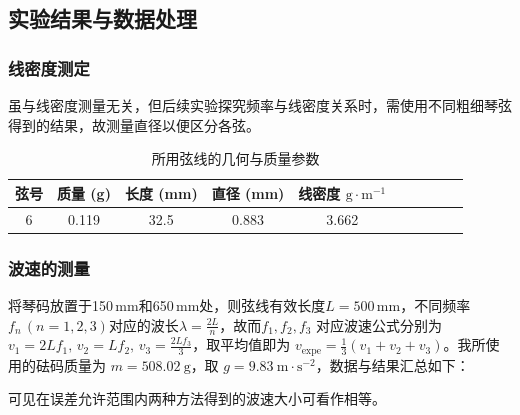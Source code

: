 \documentclass[UTF8]{article}
\theoremstyle{MyLineTheoremStyle} %
\theoremstyle{MyBlockTheoremStyle} %
\theoremstyle{MySubsubsectionStyle} %
\begin{document}
\subsection{实验结果与数据处理}
\subsubsection{线密度测定}
虽与线密度测量无关，但后续实验探究频率与线密度关系时，需使用不同粗细琴弦得到的结果，故测量直径以便区分各弦。
\begin{table}[H]\centering
    \caption{所用弦线的几何与质量参数}
    \label{所用弦线的几何与质量参数}
\begin{tabular}{cccccccccc}\toprule
    弦号 & 质量 (g) & 长度 (mm) & 直径 (mm) & 线密度 $\mathrm{g\cdot m^{-1}}$ \\
    \midrule
    6 & 0.119 & 32.5 &	0.883 &	3.662 \\
    \bottomrule
\end{tabular}
\end{table}


\subsubsection{波速的测量}
将琴码放置于150\,mm和650\,mm处，则弦线有效长度$ L=500\,\mathrm{mm} $，不同频率$ f_n\,(n=1,2,3) $对应的波长$ \lambda=\frac{2L}{n} $，故而$ f_1,f_2,f_3 $ 对应波速公式分别为 $ v_1=2Lf_1,\,v_2=Lf_2,\,v_3=\frac{2Lf_3}{3} $，取平均值即为 $v_{\text{expe}} = \frac{1}{3}\left(v_1 + v_2 + v_3\right)$。我所使用的砝码质量为 $m = 508.02 \ \mathrm{g}$，取 $g = 9.83 \ \mathrm{m\cdot s^{-2}}$，数据与结果汇总如下：
\begin{table}[H]\centering
    \caption{不同张力下波速的测量}
    \label{不同张力下波速的测量}
\end{table}
可见在误差允许范围内两种方法得到的波速大小可看作相等。
\end{document}
